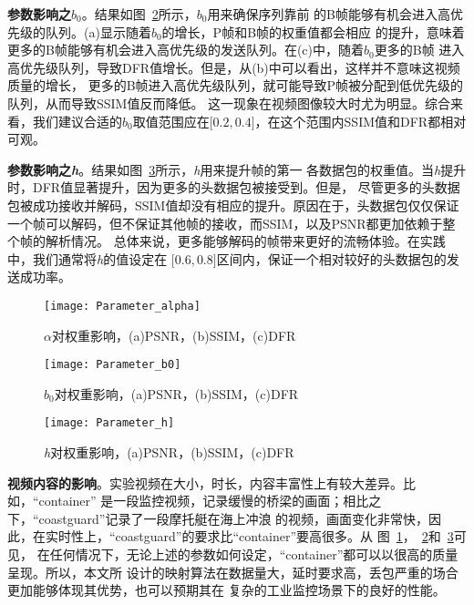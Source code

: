 \textbf{参数影响之$b_{0}$}。结果如图~\ref{fig:parameter_b0}所示，$b_{0}$用来确保序列靠前
的B帧能够有机会进入高优先级的队列。(a)显示随着$b_{0}$的增长，P帧和B帧的权重值都会相应
的提升，意味着更多的B帧能够有机会进入高优先级的发送队列。在(c)中，随着$b_{0}$更多的B帧
进入高优先级队列，导致DFR值增长。但是，从(b)中可以看出，这样并不意味这视频质量的增长，
更多的B帧进入高优先级队列，就可能导致P帧被分配到低优先级的队列，从而导致SSIM值反而降低。
这一现象在视频图像较大时尤为明显。综合来看，我们建议合适的$b_{0}$取值范围应在$\lbrack0.2,
0.4\rbrack$，在这个范围内SSIM值和DFR都相对可观。

\textbf{参数影响之\emph{h}}。结果如图~\ref{fig:parameter_h}所示，\emph{h}用来提升帧的第一
各数据包的权重值。当\emph{h}提升时，DFR值显著提升，因为更多的头数据包被接受到。但是，
尽管更多的头数据包被成功接收并解码，SSIM值却没有相应的提升。原因在于，头数据包仅仅保证
一个帧可以解码，但不保证其他帧的接收，而SSIM，以及PSNR都更加依赖于整个帧的解析情况。
总体来说，更多能够解码的帧带来更好的流畅体验。在实践中，我们通常将\emph{h}的值设定在
$\lbrack0.6,0.8\rbrack$区间内，保证一个相对较好的头数据包的发送成功率。

\begin{figure}[H] %
  \centering
  \texttt{[image: Parameter\_alpha]}
  \caption{$\alpha$对权重影响，(a)PSNR，(b)SSIM，(c)DFR}
  \label{fig:parameter_alpha}
\end{figure}
\begin{figure}[H] %
  \centering
  \texttt{[image: Parameter\_b0]}
  \caption{$b_{0}$对权重影响，(a)PSNR，(b)SSIM，(c)DFR}
  \label{fig:parameter_b0}
\end{figure}
\begin{figure}[H] %
  \centering
  \texttt{[image: Parameter\_h]}
  \caption{\emph{h}对权重影响，(a)PSNR，(b)SSIM，(c)DFR}
  \label{fig:parameter_h}
\end{figure}

\textbf{视频内容的影响}。实验视频在大小，时长，内容丰富性上有较大差异。比如，“container”
是一段监控视频，记录缓慢的桥梁的画面；相比之下，“coastguard”记录了一段摩托艇在海上冲浪
的视频，画面变化非常快，因此，在实时性上，“coastguard”的要求比“container”要高很多。从
图~\ref{fig:parameter_alpha}，~\ref{fig:parameter_b0}和~\ref{fig:parameter_h}可见，
在任何情况下，无论上述的参数如何设定，“container”都可以以很高的质量呈现。所以，本文所
设计的映射算法在数据量大，延时要求高，丢包严重的场合更加能够体现其优势，也可以预期其在
复杂的工业监控场景下的良好的性能。

